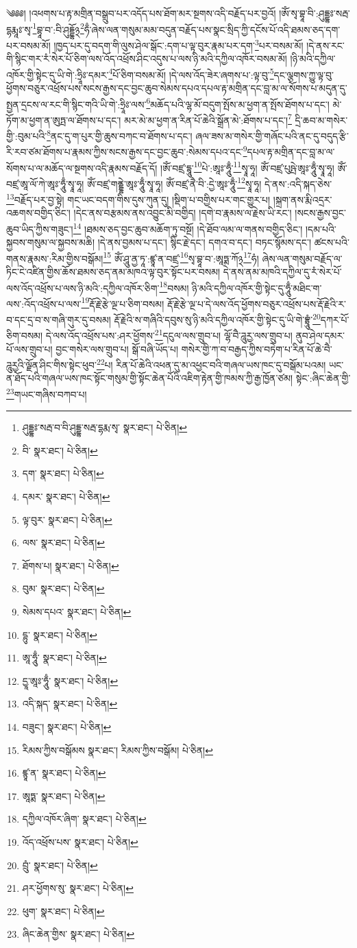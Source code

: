 \setcounter{footnote}{0} 
༄༅༅། །འཕགས་པ་རྟ་མགྲིན་བསྒྲུབ་པར་འདོད་པས་ཐོག་མར་སྔགས་འདི་བརྗོད་པར་བྱའོ། །ཨོཾ་སྭ་བྷཱ་བི་:ཤུདྡྷཿ་སརྦ་དྷརྨཱཿ་སྭ་\footnote{ཤུདྡྷཿ་སརྦ་བ་བི་ཤུདྡྷ་སརྦ་དྷརྨ་སྭ་  སྣར་ཐང་།  པེ་ཅིན། }བྷཱ་བ་:བི་ཤུདྡྷོ྅\footnote{བི་  སྣར་ཐང་།  པེ་ཅིན། }ཧྃ་ཞེས་ལན་གསུམ་མམ་བདུན་བརྗོད་པས་སྣང་སྲིད་ཀྱི་དངོས་པོ་འདི་ཐམས་ཅད་དག་པར་བསམ་མོ། །ཁྱད་པར་དུ་བདག་གི་ལུས་ཤེལ་སྒོང་:དག་པ་ལྟ་བུར་རྣམ་པར་དག་\footnote{དག་  སྣར་ཐང་།  པེ་ཅིན། }པར་བསམ་མོ། །དེ་ནས་རང་གི་སྙིང་གར་རཾ་སེར་པོ་ཅིག་ལས་འོད་འཕྲོས་ཤིང་འདུས་པ་ལས་ཉི་མའི་དཀྱིལ་འཁོར་བསམ་མོ། །ཉི་མའི་དཀྱིལ་འཁོར་གྱི་སྟེང་དུ་ཡི་གེ་:ཧྲཱིཿ་དམར་\footnote{དམར་  སྣར་ཐང་།  པེ་ཅིན། }པོ་ཅིག་བསམ་མོ། །དེ་ལས་འོད་ཟེར་ཞགས་པ་:ལྟ་བུ་\footnote{ལྟ་བུར་  སྣར་ཐང་།  པེ་ཅིན། }དང་ལྕགས་ཀྱུ་ལྟ་བུ་ཕྱོགས་བཅུར་འཕྲོས་པས་སངས་རྒྱས་དང་བྱང་ཆུབ་སེམས་དཔའ་དཔལ་རྟ་མགྲིན་དང་བླ་མ་ལ་སོགས་པ་མདུན་དུ་སྤྱན་དྲངས་ལ་རང་གི་སྙིང་གའི་ཡི་གེ་:ཧྲཱིཿ་ལས་\footnote{ལས་  སྣར་ཐང་།  པེ་ཅིན། }མཆོད་པའི་ལྷ་མོ་བདུག་སྤོས་མ་ཕྱག་ན་སྤོས་ཐོགས་པ་དང་། མེ་ཏོག་མ་ཕྱག་ན་ཨུཏྤ་ལ་ཐོགས་པ་དང་། མར་མེ་མ་ཕྱག་ན་རིན་པོ་ཆེའི་སྒྲོན་མེ་:ཐོགས་པ་དང་།\footnote{ཐོགས་པ།  སྣར་ཐང་།  པེ་ཅིན། } དྲི་ཆབ་མ་གསེར་གྱི་:བུམ་པའི་\footnote{བུམ་  སྣར་ཐང་།  པེ་ཅིན། }ནང་དུ་ག་པུར་གྱི་ཆུས་བཀང་བ་ཐོགས་པ་དང་། ཞལ་ཟས་མ་གསེར་གྱི་གཞོང་པའི་ནང་དུ་བདུད་རྩི་རི་རབ་ཙམ་ཐོགས་པ་རྣམས་ཀྱིས་སངས་རྒྱས་དང་བྱང་ཆུབ་:སེམས་དཔའ་དང་\footnote{སེམས་དཔའ་  སྣར་ཐང་།  པེ་ཅིན། }དཔལ་རྟ་མགྲིན་དང་བླ་མ་ལ་སོགས་པ་ལ་མཆོད་ལ་སྔགས་འདི་རྣམས་བརྗོད་དོ། །ཨོཾ་བཛྲ་དྷཱུ་\footnote{དྷུ་  སྣར་ཐང་།  པེ་ཅིན། }པེ་:ཨཱཿ་ཧཱུྃ་\footnote{ཨཱ་ཧཱུྃ་  སྣར་ཐང་།  པེ་ཅིན། }སྭཱ་ཧཱ། ཨོཾ་བཛྲ་པུཥྤེ་ཨཱཿ་ཧཱུྃ་སྭཱ་ཧཱ། ཨོཾ་བཛྲ་ཨཱ་ལོ་ཀེ་ཨཱཿ་ཧཱུྃ་སྭཱ་ཧཱ། ཨོཾ་བཛྲ་གནྡྷེ་ཨཱཿ་ཧཱུྃ་སྭཱ་ཧཱ། ཨོཾ་བཛྲ་ནཻ་བི་:དྱེ་ཨཱཿ་ཧཱུྃ་\footnote{དྱཱ་ཨཱཿ་ཧཱུྃ་  སྣར་ཐང་།  པེ་ཅིན། }སྭཱ་ཧཱ། དེ་ནས་:འདི་སྐད་ཅེས་\footnote{འདི་སྐད་  སྣར་ཐང་།  པེ་ཅིན། }བརྗོད་པར་བྱ་སྟེ། གང་ཡང་བདག་གིས་དུས་ཀུན་དུ། །སྡིག་པ་བགྱིས་པར་གང་གྱུར་པ། །སྐྲག་ནས་རྨི་འདྲར་འཆགས་བགྱིད་ཅིང་། །དེང་ནས་བརྩམས་ནས་འབྱུང་མི་བགྱིད། །དགེ་བ་རྣམས་ལ་རྗེས་ཡི་རང་། །སངས་རྒྱས་བྱང་ཆུབ་ཡིད་ཀྱིས་གཟུང་།\footnote{བཟུང་།  སྣར་ཐང་།  པེ་ཅིན། } །ཐམས་ཅད་བྱང་ཆུབ་མཆོག་ཏུ་བསྔོ། །དེ་ཐོབ་ལམ་ལ་གནས་བགྱིད་ཅིང་། །དམ་པའི་སྐྱབས་གསུམ་ལ་སྐྱབས་མཆི། །དེ་ནས་བྱམས་པ་དང་། སྙིང་རྗེ་དང་། དགའ་བ་དང་། བཏང་སྙོམས་དང་། ཚངས་པའི་གནས་རྣམས་:རིམ་གྱིས་བསྒོམ།\footnote{རིམས་ཀྱིས་བསྒོམས  སྣར་ཐང་། རིམས་ཀྱིས་བསྒོམ།  པེ་ཅིན། } ཨོཾ་ཤཱུ་ནྱ་ཏཱ་:ཛྙཱ་ན་བཛྲ་\footnote{ཛྙཱ་ན་  སྣར་ཐང་།  པེ་ཅིན། }སྭ་བྷཱ་བ་:ཨཱཏྨ་ཀོ྅\footnote{ཨཱཏྨ་  སྣར་ཐང་།  པེ་ཅིན། }ཧཾ། ཞེས་ལན་གསུམ་བརྗོད་ལ་ཏིང་ངེ་འཛིན་གྱིས་ཆོས་ཐམས་ཅད་ནམ་མཁའ་ལྟ་བུར་སྟོང་པར་བསམ། དེ་ནས་ནམ་མཁའི་དཀྱིལ་དུ་རཾ་སེར་པོ་ལས་འོད་འཕྲོས་པ་ལས་ཉི་མའི་:དཀྱིལ་འཁོར་ཅིག་\footnote{དཀྱིལ་འཁོར་ཞིག་  སྣར་ཐང་།  པེ་ཅིན། }བསམ། ཉི་མའི་དཀྱིལ་འཁོར་གྱི་སྟེང་དུ་ཧཱུྃ་མཐིང་ག་ལས་:འོད་འཕྲོས་པ་ལས་\footnote{འོད་འཕྲོས་པས་  སྣར་ཐང་།  པེ་ཅིན། }རྡོ་རྗེ་རྩེ་ལྔ་པ་ཅིག་བསམ། རྡོ་རྗེ་རྩེ་ལྔ་པ་དེ་ལས་འོད་ཕྱོགས་བཅུར་འཕྲོས་པས་རྡོ་རྗེའི་ར་བ་དང་དྲ་བ་ས་གཞི་གུར་དུ་བསམ། རྡོ་རྗེའི་ས་གཞིའི་དབུས་སུ་ཉི་མའི་དཀྱིལ་འཁོར་གྱི་སྟེང་དུ་ཡི་གེ་བྷྲཱུཾ་\footnote{བྲུཾ་  སྣར་ཐང་།  པེ་ཅིན། }དཀར་པོ་ཅིག་བསམ། དེ་ལས་འོད་འཕྲོས་པས་:ཤར་ཕྱོགས་\footnote{ཤར་ཕྱོགས་སུ་  སྣར་ཐང་།  པེ་ཅིན། }དངུལ་ལས་གྲུབ་པ། ལྷོ་བཻ་ཌཱུརྱ་ལས་གྲུབ་པ། ནུབ་ཤེལ་དམར་པོ་ལས་གྲུབ་པ། བྱང་གསེར་ལས་གྲུབ་པ། སྒོ་བཞི་ཡོད་པ། གསེར་གྱི་ཀ་བ་བརྒྱད་ཀྱིས་བཏེག་པ་རིན་པོ་ཆེ་བཻ་ཌཱུརྱའི་ལྗོན་ཤིང་གིས་སྟེང་ཕུབ་\footnote{ཕུག་  སྣར་ཐང་།  པེ་ཅིན། }པ། རིན་པོ་ཆེའི་འཕན་དུ་མ་འཕྱང་བའི་གཞལ་ཡས་ཁང་དུ་བསྒོམ་པའམ། ཡང་ན་ཐོད་པའི་གཞལ་ཡས་ཁང་སྟོང་གསུམ་གྱི་སྟོང་ཆེན་པོའི་འཇིག་རྟེན་གྱི་ཁམས་ཀྱི་རྒྱ་ཁྱོན་ཙམ། སྟེང་:ཞིང་ཆེན་གྱི་\footnote{ཞིང་ཆེན་གྱིས་  སྣར་ཐང་།  པེ་ཅིན། }གཡང་གཞིས་བཀབ་པ། 
